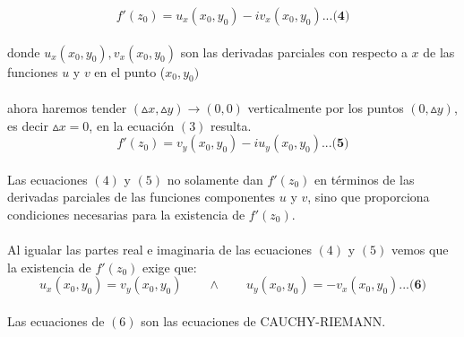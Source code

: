 \documentclass[10pt,a4paper]{book}
\begin{document}
$$f'(z_0)=u_x(x_0,y_0)-iv_x(x_0,y_0) \textbf{...(4)}$$
\\
donde $u_x(x_0,y_0), v_x(x_0,y_0)$ son las derivadas parciales con respecto a $x$ de las funciones $u$ y $v$ en el punto ($x_0,y_0)$
\\
\\
ahora haremos tender $(\vartriangle x, \vartriangle y) \longrightarrow (0,0)$ verticalmente por los puntos $(0,\vartriangle y)$, es decir $\vartriangle x=0$, en la ecuación $(3)$ resulta.
\\
$$f'(z_0)=v_y(x_0,y_0)-iu_y(x_0,y_0) \textbf{...(5)}$$
\\
Las ecuaciones $(4)$ y $(5)$ no solamente dan $f'(z_0)$ en términos de las derivadas parciales de las funciones componentes $u$ y $v$, sino que proporciona condiciones necesarias para la existencia de $f'(z_0)$.
\\
\\
Al igualar las partes real e imaginaria de las ecuaciones $(4)$ y $(5)$ vemos que la existencia de $f'(z_0)$ exige que:
\\
$$u_x(x_0,y_0)=v_y(x_0,y_0) \qquad \wedge \qquad u_y(x_0,y_0)=-v_x(x_0,y_0) \textbf{...(6)}$$
\\
Las ecuaciones de $(6)$ son las ecuaciones de CAUCHY-RIEMANN.
\end{document}
